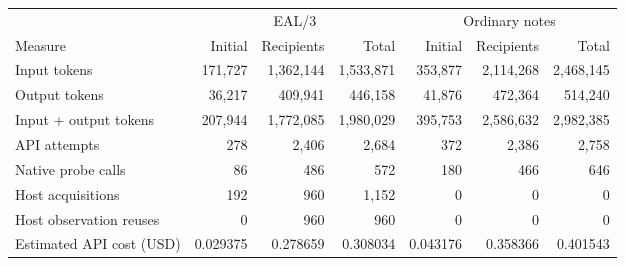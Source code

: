 \begin{tabular}{@{}lrrrrrr@{}}\toprule
& \multicolumn{3}{c}{EAL/3} & \multicolumn{3}{c}{Ordinary notes}\\
\cmidrule(lr){2-4}\cmidrule(l){5-7}
Measure & Initial & Recipients & Total & Initial & Recipients & Total\\\midrule
Input tokens & 171,727 & 1,362,144 & 1,533,871 & 353,877 & 2,114,268 & 2,468,145 \\
Output tokens & 36,217 & 409,941 & 446,158 & 41,876 & 472,364 & 514,240 \\
Input + output tokens & 207,944 & 1,772,085 & 1,980,029 & 395,753 & 2,586,632 & 2,982,385 \\
API attempts & 278 & 2,406 & 2,684 & 372 & 2,386 & 2,758 \\
Native probe calls & 86 & 486 & 572 & 180 & 466 & 646 \\
Host acquisitions & 192 & 960 & 1,152 & 0 & 0 & 0 \\
Host observation reuses & 0 & 960 & 960 & 0 & 0 & 0 \\
Estimated API cost (USD) & 0.029375 & 0.278659 & 0.308034 & 0.043176 & 0.358366 & 0.401543 \\
\bottomrule\end{tabular}
